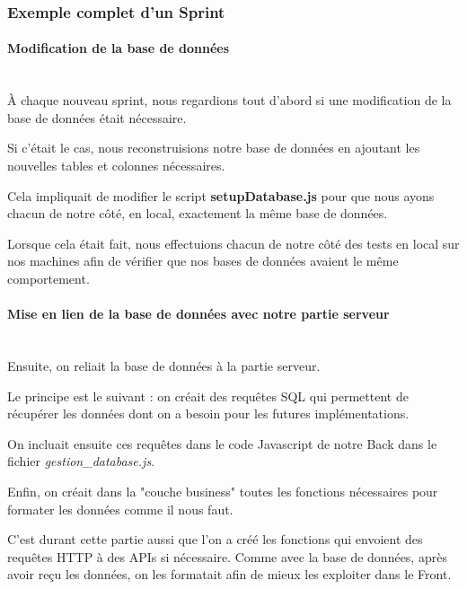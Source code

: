 \documentclass[12pt,french]{article}
\begin{document}
\subsubsection{Exemple complet d'un Sprint}

\paragraph{Modification de la base de données \\\\}

À chaque nouveau \gls{sprint}, nous regardions tout d'abord si une modification de la base de données était nécessaire.

Si c'était le cas, nous reconstruisions notre base de données en ajoutant les nouvelles \gls{table}s et \gls{colonne}s nécessaires.

Cela impliquait de modifier le script \textbf{setupDatabase.js} pour que nous ayons chacun de notre côté, en local, exactement la même base de données.

Lorsque cela était fait, nous effectuions chacun de notre côté des tests en local sur nos machines afin de vérifier que nos bases de données avaient le même comportement.

\paragraph{Mise en lien de la base de données avec notre partie serveur \\\\}

Ensuite, on reliait la base de données à la partie serveur.

\medskip

Le principe est le suivant : on créait des requêtes \gls{SQL} qui permettent de récupérer les données dont on a besoin pour les futures implémentations.

On incluait ensuite ces requêtes dans le code \gls{Javascript} de notre \gls{Back} dans le fichier \textit{gestion\_database.js}.

Enfin, on créait dans la "couche business" toutes les fonctions nécessaires pour formater les données comme il nous faut.

C'est durant cette partie aussi que l'on a créé les fonctions qui envoient des requêtes \gls{HTTP} à des \gls{API}s si nécessaire. Comme avec la base de données, après avoir reçu les données, on les formatait afin de mieux les exploiter dans le \gls{Front}.
\end{document}
